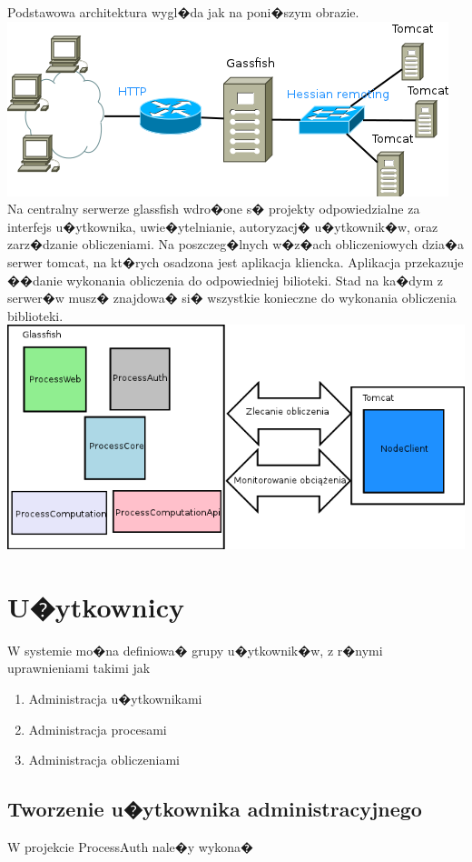 \documentclass{article}
\begin{document}
Podstawowa architektura wygl�da jak na poni�szym obrazie.\newline
\includegraphics[scale=0.5]{img/overview.png} 
\newline
Na centralny serwerze glassfish wdro�one s� projekty odpowiedzialne za interfejs u�ytkownika, uwie�ytelnianie, autoryzacj� u�ytkownik�w,
oraz zarz�dzanie obliczeniami. Na poszczeg�lnych w�z�ach obliczeniowych dzia�a serwer tomcat, na kt�rych osadzona jest aplikacja kliencka.
Aplikacja przekazuje ��danie wykonania obliczenia do odpowiedniej bilioteki. Stad na ka�dym z serwer�w musz� znajdowa� si� wszystkie konieczne
do wykonania obliczenia biblioteki.
\newline
\includegraphics[scale=0.5]{img/projects.png}

\section{U�ytkownicy}
W systemie mo�na definiowa� grupy u�ytkownik�w, z r�nymi uprawnieniami takimi jak
\begin{enumerate}
\item Administracja u�ytkownikami
\item Administracja procesami
\item Administracja obliczeniami
\end{enumerate} 
\subsection{Tworzenie u�ytkownika administracyjnego}
W projekcie ProcessAuth nale�y wykona�
\end{document}
